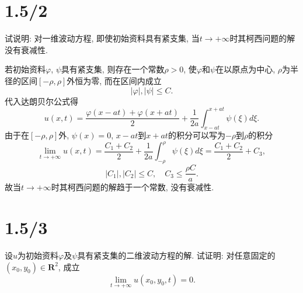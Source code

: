 \documentclass[11pt,a4paper]{article}
\author{刘逸灏 (515370910207)}
\begin{document}
\maketitle

\section{1.5/2}
\begin{problem}
试说明: 对一维波动方程, 即使初始资料具有紧支集, 当$t\to+\infty$时其柯西问题的解没有衰减性.
\end{problem}

若初始资料$\varphi$, $\psi$具有紧支集, 则存在一个常数$\rho>0$, 使$\varphi$和$\psi$在以原点为中心, $\rho$为半径的区间$[-\rho,\rho]$外恒为零, 而在区间内成立
$$|\varphi|,|\psi|\leqslant C.$$
代入达朗贝尔公式得
$$u(x,t)=\frac{\varphi(x-at)+\varphi(x+at)}{2}+\frac{1}{2a}\int_{x-at}^{x+at}\psi(\xi)d\xi.$$
由于在$[-\rho,\rho]$外, $\psi(x)=0$, $x-at$到$x+at$的积分可以写为$-\rho$到$\rho$的积分
$$\lim_{t\to+\infty}u(x,t)=\frac{C_1+C_2}{2}+\frac{1}{2a}\int_{-\rho}^{\rho}\psi(\xi)d\xi=\frac{C_1+C_2}{2}+C_3,$$
$$|C_1|,|C_2|\leqslant C,\quad C_3\leqslant\frac{\rho C}{a}.$$
故当$t\to+\infty$时其柯西问题的解趋于一个常数, 没有衰减性.

\section{1.5/3}
\begin{problem}
  设$u$为初始资料$\varphi$及$\psi$具有紧支集的二维波动方程的解. 试证明: 对任意固定的$(x_0,y_0)\in \mathbf{R}^2$, 成立
  $$\lim_{t\to+\infty} u(x_0,y_0,t)=0.$$
\end{problem}
\end{document}
